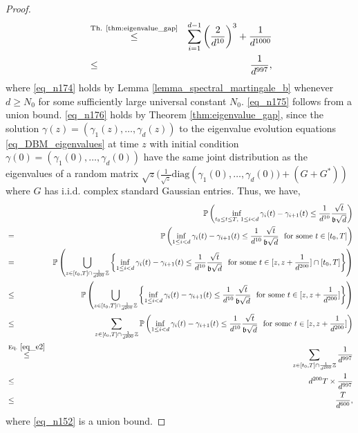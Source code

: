 \documentclass[11pt,letterpaper]{article}
\begin{document}
\begin{proof}
\begin{eqnarray}
   &  \stackrel{\textrm{Th.  \ref{thm:eigenvalue_gap}}}{\leq}&  \sum_{i=1}^{d-1}  \left(\frac{2}{d^{10}}\right)^{3} + \frac{1}{d^{1000}} \label{eq_n176}\\
   &\leq & \frac{1}{d^{997}}, \label{eq_e2}
 \end{eqnarray}
 where \eqref{eq_n174} holds by Lemma \ref{lemma_spectral_martingale_b} whenever $d \geq N_0$ for some sufficiently large universal constant $N_0$.
\eqref{eq_n175} follows from a union bound. 
 \eqref{eq_n176} holds by Theorem \ref{thm:eigenvalue_gap}, since the solution $\gamma(z) = (\gamma_1(z), \ldots, \gamma_d(z))$ to the eigenvalue evolution equations \eqref{eq_DBM_eigenvalues} at time $z$ with initial condition $\gamma(0) = (\gamma_1(0), \ldots, \gamma_d(0))$ have the same joint distribution as the eigenvalues of a random matrix $\sqrt{z}(\frac{1}{\sqrt{z}}\mathrm{diag}\left(\gamma_1(0), \ldots, \gamma_d(0)) + (G+G^\ast)\right)$ where $G$ has i.i.d. complex standard Gaussian entries.
%
Thus, we have,
%
\begin{eqnarray}
& & \!\!\!\!\!\!\! \!\!\!\!\!\!\! \!\!\!\!\!\!\!  \mathbb{P}\left(\inf_{t_0 \leq t \leq T, \, \, 1\leq i < d  }\gamma_i(t) - \gamma_{i+1}(t) \leq \frac{1}{d^{10}} \frac{\sqrt{t}}{\mathfrak{b}\sqrt{d}}\right) \nonumber\\
& = & \mathbb{P}\left(\inf_{1\leq i < d} \gamma_i(t) - \gamma_{i+1}(t) \leq \frac{1}{d^{10}} \frac{\sqrt{t}}{\mathfrak{b}\sqrt{d}}      \, \,  \textrm{ for some }   t\in [t_0, T] \right) \nonumber\\
%
&= & \mathbb{P}\left( \bigcup_{z\in [t_0, T] \cap \frac{1}{d^{200}} \mathbb{Z}} \left \{ \inf_{1\leq i < d  }\gamma_i(t) - \gamma_{i+1}(t) \leq \frac{1}{d^{10}} \frac{\sqrt{t}}{\mathfrak{b}\sqrt{d}}   \, \,   \textrm{ for some }   t \in [z, z + \frac{1}{d^{200}}] \cap [t_0, T] \right \} \right) \nonumber\\
%
&\leq & \mathbb{P}\left( \bigcup_{z\in [t_0, T] \cap \frac{1}{d^{200}} \mathbb{Z}} \left \{ \inf_{1\leq i < d }\gamma_i(t) - \gamma_{i+1}(t) \leq \frac{1}{d^{10}} \frac{\sqrt{t}}{\mathfrak{b}\sqrt{d}}   \, \,   \textrm{ for some }   t \in [z, z + \frac{1}{d^{200}}] \right \} \right) \nonumber\\
&\leq &\sum_{z\in [t_0, T] \cap \frac{1}{d^{200}}\mathbb{Z}}  \mathbb{P}\left( \inf_{1\leq i < d }\gamma_i(t) - \gamma_{i+1}(t) \leq \frac{1}{d^{10}} \frac{\sqrt{t}}{\mathfrak{b}\sqrt{d}}   \, \,   \textrm{ for some }   t \in [z, z + \frac{1}{d^{200}}] \right) \label{eq_n152}\\
%
&\stackrel{\textrm{Eq. } \eqref{eq_e2}}{\leq}& \sum_{z\in [t_0, T] \cap \frac{1}{d^{200}}\mathbb{Z}}  \frac{1}{d^{997}} \nonumber\\
%
  & \leq & d^{200} T \times  \frac{1}{d^{997}} \nonumber\\
   &\leq & \frac{T}{d^{600}}, \nonumber
%
\end{eqnarray}
%
where \eqref{eq_n152} is a union bound. 
%
\end{proof}
\end{document}
